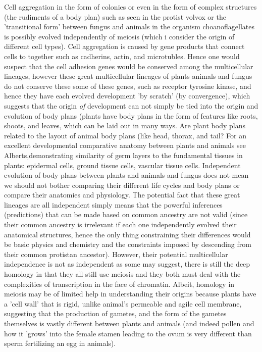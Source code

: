 Cell aggregation in the form of colonies or even in the form of complex structures (the rudiments of a body plan) such as seen in the protist volvox or the 'transitional form' between fungus and animals in the organism choanoflagellates is possibly evolved independently of meiosis (which i consider the origin of different cell types).  Cell aggregation is caused by gene products that connect cells to together such as cadherins, actin, and microtubles.  Hence one would suspect that the cell adhesion genes would be conserved among the multicellular lineages, however these great multicellular lineages of plants animals and fungus do not conserve these some of these genes, such as receptor tyrosine kinase, and hence they have each evolved development 'by scratch' (by convergence), which suggests that the origin \textit{of} development can not simply be tied into the origin and evolution of body plans (plants have body plans in the form of features like roots, shoots, and leaves, which can be laid out in many ways.  Are plant body plans related to the layout of animal body plans (like head, thorax, and tail?  For an excellent developmental comparative anatomy between plants and animals see Alberts\cite{Molbiocell},demonstrating similarity of germ layers to the fundamental tissues in plants: epidermal cells, ground tissue cells, vascular tissue cells.  Independent evolution of body plans between plants and animals and fungus does not mean we should not bother comparing their different life cycles and body plans or compare their anatomies and physiology.  The potential fact that these great lineages are all independent simply means that the powerful inferences (predictions) that can be made based on common ancestry are not valid (since their common ancestry is irrelevant if each one independently evolved their anatomical structures, hence the only thing constraining their differences would be basic physics and chemistry and the constraints imposed by descending from their common protistan ancestor).  However, their potential multicellular independence is not as independent as some may suggest, there is still the deep homology in that they all still use meiosis and they both must deal with the complexities of transcription in the face of chromatin.  Albeit, homology in meiosis may be of limited help in understanding their origins because plants have a 'cell wall' that is rigid, unlike animal's permeable and agile cell membrane, suggesting that the production of gametes, and the form of the gametes themselves is vastly different between plants and animals (and indeed pollen and how it 'grows' into the female stamen leading to the ovum is very different than sperm fertilizing an egg in animals). 

